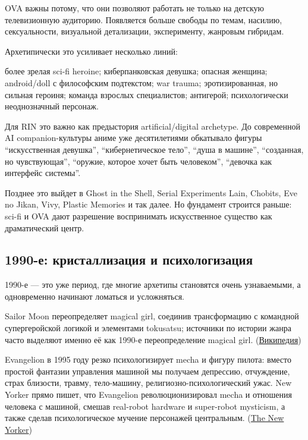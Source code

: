 OVA важны потому, что они позволяют работать не только на детскую
телевизионную аудиторию. Появляется больше свободы по темам, насилию,
сексуальности, визуальной детализации, эксперименту, жанровым гибридам.

Архетипически это усиливает несколько линий:

более зрелая sci-fi heroine; киберпанковская девушка; опасная женщина;
android/\hspace{0pt}doll с философским подтекстом; war trauma; эротизированная, но
сильная героиня; команда взрослых специалистов; антигерой;
психологически неоднозначный персонаж.

Для RIN это важно как предыстория artificial/\hspace{0pt}digital archetype. До
современной AI companion-культуры аниме уже десятилетиями обкатывало
фигуры ``искусственная девушка'', ``кибернетическое тело'', ``душа в
машине'', ``созданная, но чувствующая'', ``оружие, которое хочет быть
человеком'', ``девочка как интерфейс системы''.

Позднее это выйдет в Ghost in the Shell, Serial Experiments Lain,
Chobits, Eve no Jikan, Vivy, Plastic Memories и так далее. Но фундамент
строится раньше: sci-fi и OVA дают разрешение воспринимать искусственное
существо как драматический центр.

\subsection*{1990-е: кристаллизация и психологизация}

1990-е --- это уже период, где многие архетипы становятся очень
узнаваемыми, а одновременно начинают ломаться и усложняться.

Sailor Moon переопределяет magical girl, соединив трансформацию с
командной супергеройской логикой и элементами tokusatsu; источники по
истории жанра часто выделяют именно её как 1990-е переопределение
magical girl.
(\href{https://en.wikipedia.org/wiki/Magical_girl?utm_source=chatgpt.com}{Википедия})

Evangelion в 1995 году резко психологизирует mecha и фигуру пилота:
вместо простой фантазии управления машиной мы получаем депрессию,
отчуждение, страх близости, травму, тело-машину,
религиозно-психологический ужас. New Yorker прямо пишет, что Evangelion
революционизировал mecha и отношения человека с машиной, смешав
real-robot hardware и super-robot mysticism, а также сделав
психологическое мучение персонажей центральным.
(\href{https://www.newyorker.com/culture/culture-desk/how-neon-genesis-evangelion-reimagined-our-relationship-to-machines?utm_source=chatgpt.com}{The
New Yorker})

